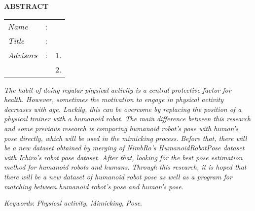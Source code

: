 \begin{center}
  \large\textbf{ABSTRACT}
\end{center}


\vspace{2ex}

\begingroup
\setlength{\tabcolsep}{0pt}

\noindent
\begin{tabularx}{\textwidth}{l >{\centering}m{3em} X}
  \emph{Name}     & : & \name{}         \\

  \emph{Title}    & : & \engtatitle{}   \\

  \emph{Advisors} & : & 1. \advisor{}   \\
                  &   & 2. \coadvisor{} \\
\end{tabularx}
\endgroup

\emph{The habit of doing regular physical activity is a central protective factor for health.
However, sometimes the motivation to engage in physical activity decreases with age.
Luckily, this can be overcome by replacing the position of a physical trainer with a humanoid robot.
The main difference between this research and some previous research is comparing humanoid robot's pose with human's pose directly, 
which will be used in the mimicking process.}
\emph{Before that, there will be a new dataset obtained by merging of NimbRo's HumanoidRobotPose dataset with Ichiro's robot pose dataset.
After that, looking for the best pose estimation method for humanoid robots and humans.
Through this research, it is hoped that there will be a new dataset of humanoid robot pose as well as a program for matching between humanoid robot's pose and human's pose.}

\emph{Keywords}: \emph{Physical activity}, \emph{Mimicking}, \emph{Pose}.
